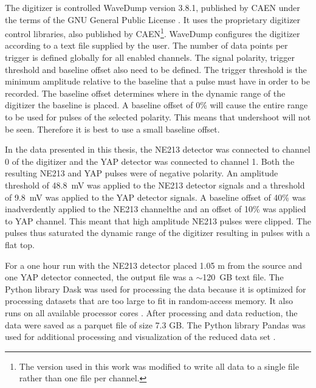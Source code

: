 \documentclass[main.tex]{subfiles}
\begin{document}

The digitizer is controlled WaveDump version 3.8.1, published by CAEN under the terms of the GNU General Public License \cite{WaveDump}. It uses the proprietary digitizer control libraries, also published by CAEN\footnote{The version used in this work was modified to write all data to a single file rather than one file per channel.}. 
WaveDump configures the digitizer according to a text file supplied by the user. The number of data points per trigger is defined globally for all enabled channels. The signal polarity, trigger threshold and baseline offset also need to be defined. The trigger threshold is the minimum amplitude relative to the baseline that a pulse must have in order to be recorded. The baseline offset determines where in the dynamic range of the digitizer the baseline is placed. A baseline offset of 0\% will cause the entire range to be used for pulses of the selected polarity. This means that undershoot will not be seen. Therefore it is best to use a small baseline offset.

In the data presented in this thesis, the NE213 detector was connected to channel 0 of the digitizer and the YAP detector was connected to channel 1. Both the resulting NE213 and YAP pulses were of negative polarity. An amplitude threshold of \SI{48.8}{mV} was applied to the NE213 detector signals and a threshold of \SI{9.8}{mV} was applied to the YAP detector signals. A baseline offset of 40\% was inadverdently applied to the NE213 channelthe and an offset of 10\% was applied to  YAP channel. This meant that high amplitude NE213 pulses were clipped. The pulses thus saturated the dynamic range of the digitizer resulting in pulses with a flat top.

For a one hour run with the NE213 detector placed 1.05 m from the source and one YAP detector connected, the output file was a $\sim$\SI{120}{GB} text file. The Python library Dask was used for processing the data because it is optimized for processing datasets that are too large to fit in random-access memory. It also runs on all available processor cores \cite{Dask}. After processing and data reduction, the data were saved as a parquet file of size 7.3 GB. The Python library Pandas was used for additional processing and visualization of the reduced data set \cite{Pandas}.
\end{document}
